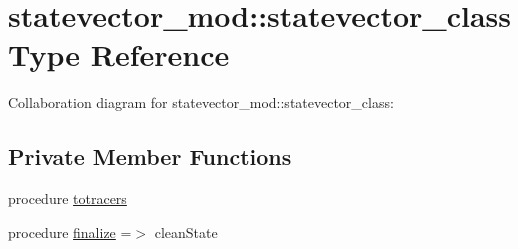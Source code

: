 \hypertarget{structstatevector__mod_1_1statevector__class}{}\section{statevector\+\_\+mod\+:\+:statevector\+\_\+class Type Reference}
\label{structstatevector__mod_1_1statevector__class}


Collaboration diagram for statevector\+\_\+mod\+:\+:statevector\+\_\+class\+:
\subsection*{Private Member Functions}
\begin{DoxyCompactItemize}
\item 
procedure \mbox{\hyperlink{structstatevector__mod_1_1statevector__class_a2e50a7dc4a09d1319aef60d94dec4a25}{totracers}}
\item 
procedure \mbox{\hyperlink{structstatevector__mod_1_1statevector__class_ae4fb91ef1a88cb853f28fc6fcc2eba6f}{finalize}} =$>$ clean\+State
\end{DoxyCompactItemize}
